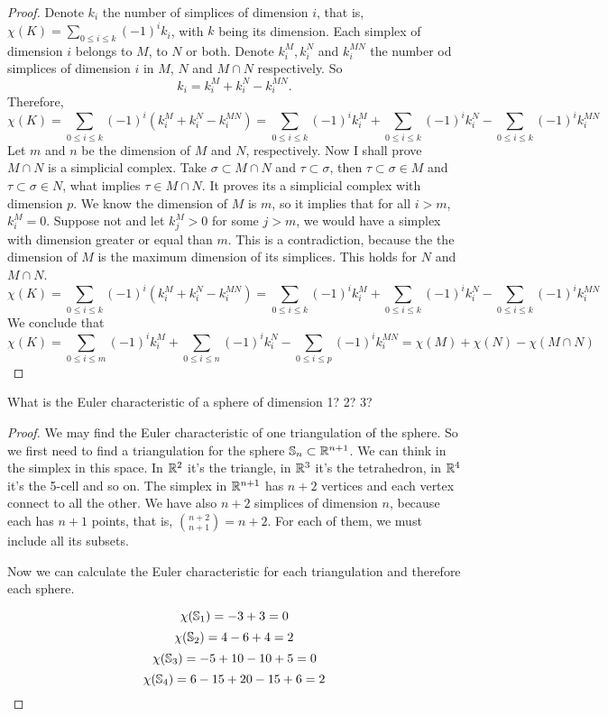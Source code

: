 \begin{proof}

Denote $k_i$ the number of simplices of dimension $i$, that is, $\chi (K) =
\sum_{0 \le i \le k} (-1)^i k_i$, with $k$ being its dimension. Each simplex of dimension $i$ belongs to
$M$, to $N$ or both. Denote $k_i^M, k_i^N$ and $k_i^{MN}$ the number od
simplices of dimension $i$ in $M$, $N$ and $M \cap N$ respectively. So
$$k_i = k_i^M + k_i^N - k_i^{MN}.$$
Therefore, 
$$
\chi(K) = \sum_{0 \le i \le k} (-1)^i (k_i^M + k_i^N - k_i^{MN}) = \sum_{0 \le i \le k}(-1)^i k_i^M + \sum_{0 \le i \le k}(-1)^i k_i^N - \sum_{0 \le i \le k}(-1)^i k_i^{MN} 
$$
Let $m$ and $n$ be the dimension of $M$ and $N$,
respectively. Now I shall prove $M \cap N$ is a simplicial complex. Take
$\sigma \subset M \cap N$ and $\tau \subset \sigma$, then $\tau \subset \sigma
\in M$ and $\tau \subset \sigma \in N$, what implies $\tau \in M \cap N$. It
proves its a simplicial complex with dimension $p$. We know the dimension of $M$ is
$m$, so it implies that for all $i > m$, $k_i^M = 0$. Suppose not and let $k_j^M > 0$ for
some $j > m$, we would have a simplex with dimension greater or equal than
$m$. This is a contradiction, because the the dimension of $M$ is the maximum
dimension of its simplices. This holds for $N$ and $M \cap N$. 
$$
\chi(K) = \sum_{0 \le i \le k} (-1)^i (k_i^M + k_i^N - k_i^{MN}) = \sum_{0 \le i \le k}(-1)^i k_i^M + \sum_{0 \le i \le k}(-1)^i k_i^N - \sum_{0 \le i \le k}(-1)^i k_i^{MN} 
$$
We conclude that 
$$
\chi(K) = \sum_{0 \le i \le m}(-1)^i k_i^M + \sum_{0 \le i \le n}(-1)^i k_i^N - \sum_{0 \le i \le p}(-1)^i k_i^{MN} = \chi(M) + \chi(N) - \chi(M \cap N)
$$
    
\end{proof}

\noindent\linia

\begin{exercise}
    What is the Euler characteristic of a sphere of dimension 1? 2? 3? 
\end{exercise}

\begin{proof}

We may find the Euler characteristic of one triangulation of the sphere. So we
first need to find a triangulation for the sphere $\mathbb{S}_n \subset
\mathbb{R}^{n+1}$. We can think in the simplex in this space. In $\mathbb{R}^2$ it's the
triangle, in  $\mathbb{R}^3$ it's the tetrahedron, in $\mathbb{R}^4$ it's the 5-cell and so
on. The simplex in $\mathbb{R}^{n+1}$ has $n + 2$ vertices and each vertex connect to
all the other. We have also $n+2$ simplices of dimension $n$, because each
has $n+1$ points, that is, $\genfrac(){0pt}{}{n+2}{n+1} = n+2$. For each of them, we
must include all its subsets. 

Now we can calculate the Euler characteristic for each triangulation and
therefore each sphere. 

$$
\chi(\mathbb{S}_1) = -3 + 3 = 0 
$$
$$
\chi(\mathbb{S}_2) = 4 - 6 + 4 = 2 
$$
$$
\chi(\mathbb{S}_3) = -5 + 10 - 10 + 5 = 0  
$$
$$
\chi(\mathbb{S}_4) = 6 - 15 + 20 - 15 + 6 = 2  
$$

    
\end{proof}

